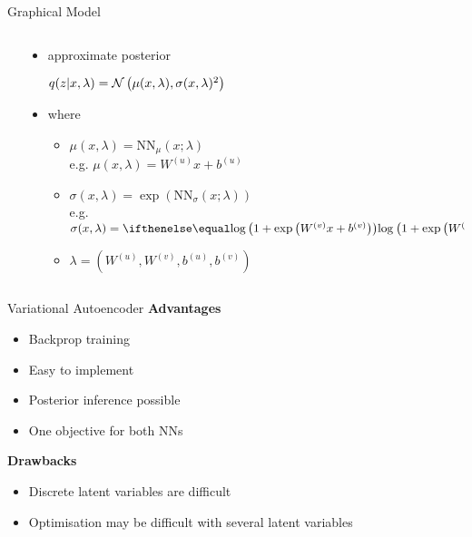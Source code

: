 \documentclass[14pt]{beamer}
\begin{document}
\begin{frame}{Graphical Model}
	
	\begin{columns}
	\begin{column}{0.2\textwidth}
    \end{column}
    \begin{column}{0.7\textwidth}
    	\begin{itemize}
			\item approximate posterior \\ 
			\begin{small}
			$q(z|x,\lambda) = \mathcal{N}\left(\mu(x,\lambda),\sigma(x,\lambda)^{2}\right)$
			\end{small} \pause
			\item where 
			\begin{itemize}
				\item $\mu(x, \lambda) = \text{NN}_{\mu}(x; \lambda) $ \\
				e.g. $\mu(x, \lambda) = W^{(u)} x + b^{(u)}$ \pause
				\item $\sigma(x, \lambda) = \exp(\text{NN}_{\sigma}(x; \lambda))$ \\
				e.g. $\sigma(x, \lambda) = \loga{ 1 + \exp \left( W^{(v)} x + b^{(v)} \right)}$ \pause
			  \item $\lambda=(W^{(u)}, W^{(v)}, b^{(u)}, b^{(v)})$
		   \end{itemize}
	  \end{itemize}
    \end{column}
    \end{columns}
\end{frame}

\begin{frame}{Variational Autoencoder}
\textbf{Advantages}
\begin{itemize}
\item Backprop training
\item Easy to implement
\item Posterior inference possible
\item One objective for both NNs
\end{itemize}
\pause
\textbf{Drawbacks}
\begin{itemize}
\item Discrete latent variables are difficult
\item Optimisation may be difficult with several latent variables
\end{itemize}
\end{frame}
\end{document}
